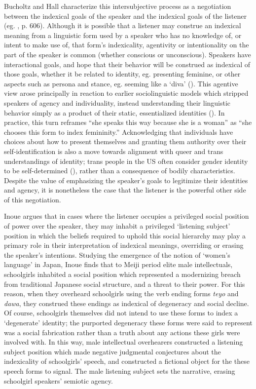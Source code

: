 \documentclass[12pt,twoside]{reedthesis}
\begin{document}
Bucholtz and Hall characterize this intersubjective process as a negotiation between the indexical goals of the speaker and the indexical goals of the listener  (eg. \cite{bucholtz_identity_2005}, p. 606). Although it is possible that a listener may construe an indexical meaning from a linguistic form used by a speaker who has no knowledge of, or intent to make use of, that form's indexicality, agentivity or intentionality on the part of the speaker is common (whether conscious or unconscious). Speakers have interactional goals, and hope that their behavior will be construed as indexical of those goals, whether it be related to identity, eg. presenting feminine, or other aspects such as persona and stance, eg. seeming like a `diva' (\cite{podesva_phonation_2007}). This agentive view arose principally in reaction to earlier sociolinguistic models which stripped speakers of agency and individuality, instead understanding their linguistic behavior simply as a product of their static, essentialized identities (\cite{eckert_three_2012}). In practice, this turn reframes ``she speaks this way because she is a woman'' as ``she chooses this form to index femininity.'' Acknowledging that individuals have choices about how to present themselves and granting them authority over their self-identification is also a move towards alignment with queer and trans understandings of identity; trans people in the US often consider gender identity to be self-determined (\cite{zimman_linguistic_2017, heffernan_constructing_2023}), rather than a consequence of bodily characteristics. Despite the value of emphasizing the speaker's goals to legitimize their identities and agency, it is nonetheless the case that the listener is the powerful other side of this negotiation.
	
Inoue \parencite*{inoue_vicarious_2006, inoue_listening_2003} argues that in cases where the listener occupies a privileged social position of power over the speaker, they may inhabit a privileged `listening subject' position in which the beliefs required to uphold this social hierarchy may play a primary role in their interpretation of indexical meanings, overriding or erasing the speaker's intentions.  Studying the emergence of the notion of `women's language' in Japan, Inoue finds that to Meiji period elite male intellectuals, schoolgirls inhabited a social position which represented a modernizing breach from traditional Japanese social structure, and a threat to their power. For this reason, when they overheard schoolgirls using the verb ending forms \textit{teyo} and \textit{dawa}, they construed these endings as indexical of degeneracy and social decline. Of course, schoolgirls themselves did not intend to use these forms to index a `degenerate' identity; the purported degeneracy these forms were said to represent was a social fabrication rather than a truth about any actions these girls were involved with. In this way, male intellectual overhearers constructed a listening subject position which made negative judgmental conjectures about the indexicality of schoolgirls' speech, and constructed a fictional object for the these speech forms to signal. The male listening subject sets the narrative, erasing schoolgirl speakers' semiotic agency.
	 
\end{document}
